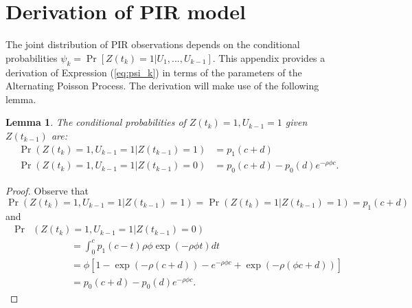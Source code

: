 \documentclass[man, noextraspace, floatsintext]{apa6}\usepackage[]{graphicx}\usepackage[]{color}
\newtheorem{lemma}{Lemma}
\begin{document}
\section{Derivation of PIR model}
\label{app:PIR_derivation}

The joint distribution of PIR observations depends on the conditional probabilities $\psi_k = \Pr\left[ Z(t_k) = 1 \left| U_1,...,U_{k-1}\right.\right]$. 
This appendix provides a derivation of Expression (\ref{eq:psi_k}) in terms of the parameters of the Alternating Poisson Process. The derivation will make use of the following lemma.

\begin{lemma}
\label{lemma1}
The conditional probabilities of $Z(t_k) = 1, U_{k-1} = 1$ given $Z(t_{k-1})$ are:
\begin{align*}
\Pr\left(Z(t_k) = 1, U_{k-1} = 1 \left| Z(t_{k-1}) = 1 \right.\right) &= p_1(c + d) \\
\Pr\left(Z(t_k) = 1, U_{k-1} = 1 \left| Z(t_{k-1}) = 0 \right.\right) &= p_0(c + d) - p_0(d) e^{-\rho \phi c}.
\end{align*}
\end{lemma}

\begin{proof}
Observe that \[
\Pr\left(Z(t_k) = 1, U_{k-1} = 1 \left| Z(t_{k-1}) = 1 \right.\right) = \Pr\left(Z(t_k) = 1 \left| Z(t_{k-1}) = 1 \right.\right) = p_1(c + d) \]
and \begin{align*}
\Pr &\left(Z(t_k) = 1, U_{k-1} = 1 \left| Z(t_{k-1}) = 0 \right.\right) \\
& \qquad \qquad = \int_0^{c} p_1(c - t) \rho \phi \exp\left(-\rho\phi t\right) dt \\
& \qquad \qquad  = \phi \left[ 1 - \exp\left(- \rho (c + d)\right) - e^{-\rho \phi c} + \exp\left(- \rho (\phi c + d)\right)\right] \\
& \qquad \qquad = p_0(c + d) - p_0(d) e^{-\rho \phi c}.
\end{align*}
\end{proof}
\end{document}
